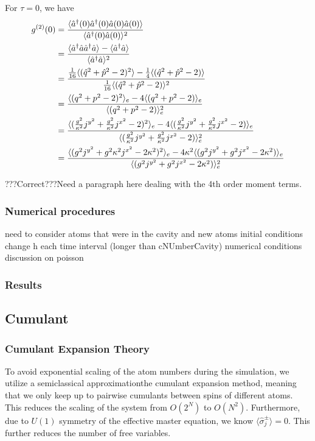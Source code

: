 \documentclass{article}
\begin{document}
\begin{enumerate}
    For $\tau = 0$, we have
    \begin{align}
                \label{g2(0)}
            \notag g^{(2)}(0) &= \frac{\langle \hat{a}^\dagger(0)\hat{a}^\dagger(0) \hat{a}(0)\hat{a}(0) \rangle}{\langle\hat{a}^\dagger(0)\hat{a}(0)\rangle^2 }\\
            \notag &= \frac{\langle \hat{a}^\dagger \hat{a} \hat{a}^\dagger \hat{a} \rangle-\langle\hat{a}^\dagger \hat{a}\rangle}{\langle\hat{a}^\dagger\hat{a}\rangle^2 }\\
            \notag&= \frac{\frac{1}{16} \langle (\hat{q}^2+\hat{p}^2-2)^2\rangle-\frac{1}{4}\langle (\hat{q}^2+\hat{p}^2-2)\rangle}{\frac{1}{16}\langle (\hat{q}^2+\hat{p}^2-2)\rangle^2 }\\
             \notag&= \frac{ \langle (q^2+p^2-2)^2\rangle_e-4\langle (q^2+p^2-2)\rangle_e}{\langle (q^2+p^2-2)\rangle_e^2 }\\
             \notag&= \frac{ \langle (\frac{g^2}{\kappa^2}j^{y^2}+\frac{g^2}{\kappa^2}j^{x^2}-2)^2\rangle_e-4\langle (\frac{g^2}{\kappa^2}j^{y^2}+\frac{g^2}{\kappa^2}j^{x^2}-2)\rangle_e}{\langle (\frac{g^2}{\kappa^2}j^{y^2}+\frac{g^2}{\kappa^2}j^{x^2}-2)\rangle_e^2 }\\
             &= \frac{ \langle (g^2j^{y^2}+g^2{\kappa^2}j^{x^2}-2\kappa^2)^2\rangle_e-4\kappa^2\langle (g^2j^{y^2}+g^2j^{x^2}-2\kappa^2)\rangle_e}{\langle (g^2j^{y^2}+g^2j^{x^2}-2\kappa^2)\rangle_e^2 }
        \end{align}
        
    ???Correct???Need a paragraph here dealing with the 4th order moment terms.
\end{enumerate}


\subsubsection{Numerical procedures}
need to consider atoms that were in the cavity and new atoms
initial conditions
change h each time interval (longer than cNUmberCavity)
numerical conditions
discussion on poisson
\subsubsection{Results}

\subsection{Cumulant}

\subsubsection{Cumulant Expansion Theory}
To avoid exponential scaling of the atom numbers during the simulation, we utilize a semiclassical approximation\textemdash the cumulant expansion method, meaning that we only keep up to pairwise cumulants between spins of different atoms. This reduces the scaling of the system from $O(2^N)$ to $O(N^2)$. Furthermore, due to $U(1)$ symmetry of the effective master equation, we know $\langle\hat{\sigma}^\pm_j\rangle=0$. This further reduces the number of free variables.
\end{document}
